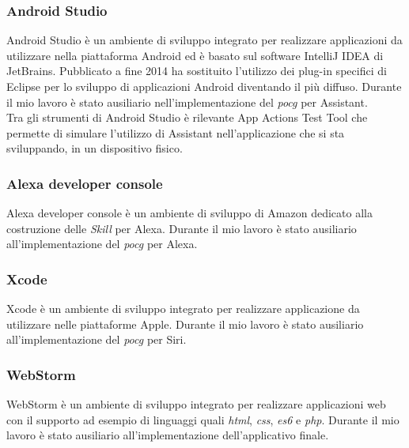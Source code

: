 		\subsubsection{Android Studio}
		Android Studio è un ambiente di sviluppo integrato per realizzare applicazioni da utilizzare nella piattaforma Android ed è basato sul software IntelliJ IDEA di JetBrains. Pubblicato a fine 2014 ha sostituito l'utilizzo dei plug-in specifici di Eclipse per lo sviluppo di applicazioni Android diventando il più diffuso. Durante il mio lavoro è stato ausiliario nell'implementazione del \emph{\gls{pocg}} per Assistant. \\
		Tra gli strumenti di Android Studio è rilevante App Actions Test Tool che permette di simulare l'utilizzo di Assistant nell'applicazione che si sta sviluppando, in un dispositivo fisico.
		\subsubsection{Alexa developer console}
		Alexa developer console è un ambiente di sviluppo di Amazon dedicato alla costruzione delle \emph{Skill} per Alexa. Durante il mio lavoro è stato ausiliario all'implementazione del \emph{\gls{pocg}} per Alexa.
		\subsubsection{Xcode}
		Xcode è un ambiente di sviluppo integrato per realizzare applicazione da utilizzare nelle piattaforme Apple. Durante il mio lavoro è stato ausiliario all'implementazione del \emph{\gls{pocg}} per Siri.
		\subsubsection{WebStorm}
		WebStorm è un ambiente di sviluppo integrato per realizzare applicazioni web con il supporto ad esempio di linguaggi quali \emph{\gls{html}}, \emph{\gls{css}}, \emph{\gls{es6}} e \emph{\gls{php}}\glsfirstoccur. Durante il mio lavoro è stato ausiliario all'implementazione dell'applicativo finale.

